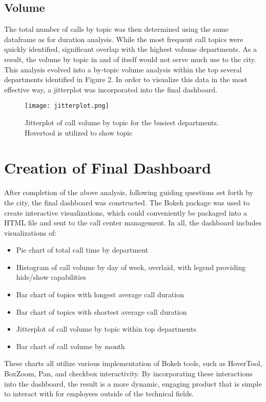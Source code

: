 \documentclass[11pt,twocolumn]{article}
\begin{document}
\subsection{Volume}
The total number of calls by topic was then determined using the same dataframe as for duration analysis.  While the most frequent call topics were quickly identified, significant overlap with the highest volume departments.  As a result, the volume by topic in and of itself would not serve much use to the city.  This analysis evolved into a by-topic volume analysis within the top several departments identified in Figure 2.  In order to visualize this data in the most effective way, a jitterplot was incorporated into the final dashboard.
\begin{figure}[h]
  \texttt{[image: jitterplot.png]}
  \caption{Jitterplot of call volume by topic for the busiest departments.  Hovertool is utilized to show topic}
\end{figure}

\section{Creation of Final Dashboard}
After completion of the above analysis, following guiding questions set forth by the city, the final dashboard was constructed.  The Bokeh package was used to create interactive visualizations, which could conveniently be packaged into a HTML file and sent to the call center management.  In all, the dashboard includes visualizations of:

\begin{itemize}
  \item{Pie chart of total call time by department}
  \item{Histogram of call volume by day of week, overlaid, with legend providing hide/show capabilities}
  \item{Bar chart of topics with longest average call duration}
  \item{Bar chart of topics with shortest average call duration}
  \item{Jitterplot of call volume by topic within top departments}
  \item{Bar chart of call volume by month}
\end{itemize}

These charts all utilize various implementation of Bokeh tools, such as HoverTool, BoxZoom, Pan, and checkbox interactivity.  By incorporating these interactions into the dashboard, the result is a more dynamic, engaging product that is simple to interact with for employees outside of the technical fields.
\end{document}
